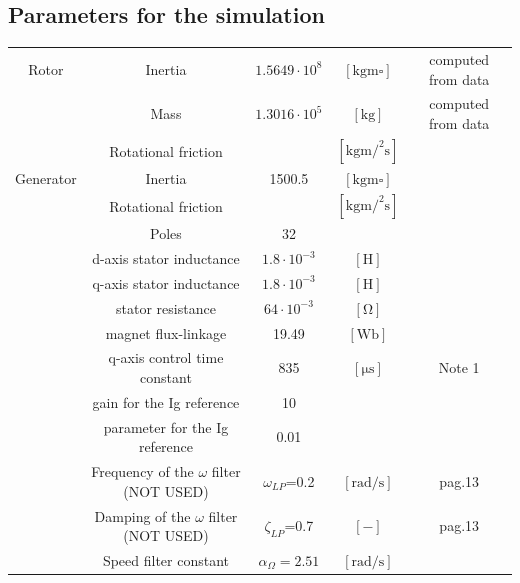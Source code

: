 \documentclass[]{article}
\begin{document}
\subsection{Parameters for the simulation}
\begin{center}
	\begin{tabular}{c|cccc}
		Rotor & Inertia & $1.5649 \cdot 10^8$ & $\left[\si{\kilo \gram \meter \square}\right]$ & computed from data\\ 
		& Mass & $1.3016 \cdot 10^5$ & $\left[\si{\kilo \gram}\right]$ & computed from data\\ 
		& Rotational friction &  & $\left[\si{\kilo \gram \meter \square \per \second}\right]$ & \\ 
		\hline 
		Generator & Inertia & 1500.5 & $\left[\si{\kilo \gram \meter \square}\right]$ & \cite{DTU_Wind_Energy_Report-I-0092} \\
		& Rotational friction &  & $\left[\si{\kilo \gram \meter \square \per \second}\right]$ & \\
		& Poles & 32 & & \cite{the_switch_datasheet} \\
		& d-axis stator inductance & $1.8 \cdot 10^{-3}$ & $\left[\si{\henry}\right]$ & \cite{10-MW_Direct-Drive_PMSG-Based_Wind_Energy_Conversion_System_Model} \\
		& q-axis stator inductance & $1.8 \cdot 10^{-3}$ & $\left[\si{\henry}\right]$ & \cite{10-MW_Direct-Drive_PMSG-Based_Wind_Energy_Conversion_System_Model} \\
		& stator resistance & $64 \cdot 10^{-3}$ & $\left[ \si{\ohm}\right]$ & \cite{10-MW_Direct-Drive_PMSG-Based_Wind_Energy_Conversion_System_Model}\\
		& magnet flux-linkage & 19.49 & $\left[ \si{\weber}\right]$ & \cite{10-MW_Direct-Drive_PMSG-Based_Wind_Energy_Conversion_System_Model} \\
		& q-axis control time constant & 835 & $\left[ \si{\micro \second}\right]$& Note 1 \\
		& gain for the Ig reference & 10 & & \cite{5874598} \\
		& parameter for the Ig reference & 0.01 & & \cite{5874598} \\ 
		& Frequency of the $\omega$ filter (NOT USED) & $\omega_{LP}$=0.2 & $\left[ \si{\radian \per \second }\right]$ & \cite{DTU_Wind_Energy_E_0028} pag.13 \\
		& Damping of the $\omega$ filter (NOT USED) & $\zeta_{LP}$=0.7 & $\left[ - \right]$ & \cite{DTU_Wind_Energy_E_0028} pag.13 \\
		& Speed filter constant & $\alpha_{\Omega}=2.51$ & $\left[\si{\radian \per \second}\right]$ & \cite{Olimpo_Anaya‐Lara} pag.180\\

\end{tabular}
\end{center}
\end{document}
